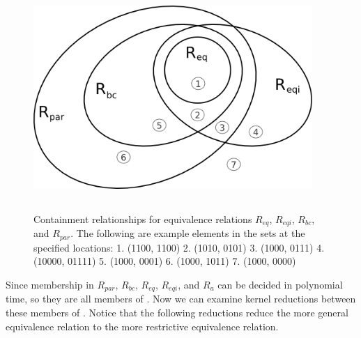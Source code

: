 \documentclass{article}
\theoremstyle{definition}
\begin{document}
\begin{figure}
  \begin{center}
    \includegraphics[width=300pt,height=241pt,keepaspectratio=true]
                    {containments.png}
  \end{center}
  \caption{ \label{fig:containments} Containment relationships for equivalence
    relations $R_{eq}$, $R_{eqi}$, $R_{bc}$, and $R_{par}$. The following are
    example elements in the sets at the specified locations: 1. (1100, 1100)
    2. (1010, 0101) 3. (1000, 0111) 4. (10000, 01111) 5. (1000, 0001) 6. (1000,
    1011) 7. (1000, 0000) }
\end{figure}

Since membership in $R_{par}$, $R_{bc}$, $R_{eq}$, $R_{eqi}$, and $R_a$ can be
decided in polynomial time, so they are all members of \PEq. Now we can examine
kernel reductions between these members of \PEq. Notice that the following
reductions reduce the more general equivalence relation to the more restrictive
equivalence relation.
\end{document}
